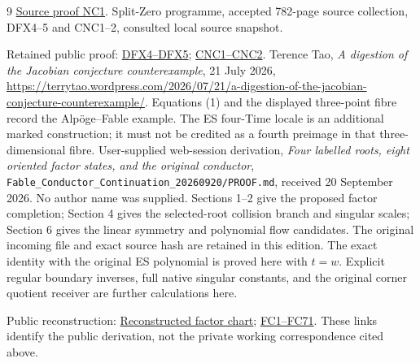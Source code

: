 \documentclass[11pt]{article}
\begin{document}
\begin{thebibliography}{9}
\href{https://github.com/KokunoYumeto/zeta-function-research-reader/blob/5992ad50c0f2a06921f1fcaded7b4e38097c0739/workbenches/splitzero-tandem/continuations/20260920-original-kernel-mixed-determinants/providers/ORIGINAL_CONDUCTOR_COPRIMALITY.tex\#L41}{Source proof NC1}.
 Split-Zero programme, accepted 782-page source
collection, DFX4--5 and CNC1--2, consulted local source snapshot.

Retained public proof: \href{https://github.com/KokunoYumeto/zeta-function-research-reader/blob/689a8f87e9c12b7a99b01b3123438c6751ee608f/workbenches/splitzero-tandem/continuations/20260921-directional-inverse-power/006/source_dependencies/ACCEPTED_782_CUMULATIVE.tex\#L30623}{DFX4--DFX5}; \href{https://github.com/KokunoYumeto/zeta-function-research-reader/blob/689a8f87e9c12b7a99b01b3123438c6751ee608f/workbenches/splitzero-tandem/continuations/20260921-directional-inverse-power/006/source_dependencies/ACCEPTED_782_CUMULATIVE.tex\#L38157}{CNC1--CNC2}.
 Terence Tao, \emph{A digestion of the Jacobian conjecture
counterexample}, 21 July 2026,
\url{https://terrytao.wordpress.com/2026/07/21/a-digestion-of-the-jacobian-conjecture-counterexample/}.
Equations (1) and the displayed three-point fibre record the
Alp\"oge--Fable example. The ES four-Time locale is an additional marked
construction; it must not be credited as a fourth preimage in that
three-dimensional fibre.
 User-supplied web-session derivation, \emph{Four labelled roots, eight oriented factor states, and the original conductor}, \texttt{Fable\_Conductor\_Continuation\_20260920/PROOF.md}, received 20 September 2026. No author name was supplied. Sections 1--2 give the proposed factor completion; Section 4 gives the selected-root collision branch and singular scales; Section 6 gives the linear symmetry and polynomial flow candidates. The original incoming file and exact source hash are retained in this edition. The exact identity with the original ES polynomial is proved here with $t=w$. Explicit regular boundary inverses, full native singular constants, and the original corner quotient receiver are further calculations here.

Public reconstruction: \href{https://github.com/KokunoYumeto/zeta-function-research-reader/blob/689a8f87e9c12b7a99b01b3123438c6751ee608f/workbenches/splitzero-tandem/continuations/20260920-fable-boundary-action/source_intake/PROOF.md\#L1}{Reconstructed factor chart}; \href{https://github.com/KokunoYumeto/zeta-function-research-reader/blob/689a8f87e9c12b7a99b01b3123438c6751ee608f/workbenches/splitzero-tandem/continuations/20260920-fable-conductor/FABLE_TO_ORIGINAL_CONDUCTOR.tex\#L52}{FC1--FC71}. These links identify the public derivation, not the private working correspondence cited above.
\end{thebibliography}
\end{document}
